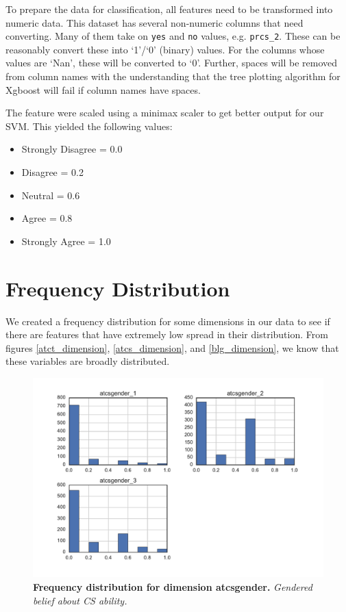 To prepare the data for classification, all features need to be transformed into numeric data. This dataset has several non-numeric columns that need converting. Many of them take on \texttt{yes} and \texttt{no} values, e.g. \texttt{prcs\_2}. These can be reasonably convert these into `1'/`0' (binary) values. For the columns whose values are `Nan', these will be converted to `0'. Further, spaces will be removed from column names with the understanding that the tree plotting algorithm for Xgboost will fail if column names have spaces. 

The feature were scaled using a minimax scaler to get better output for our SVM. This yielded the following values:
\begin {itemize}
\item Strongly Disagree = 0.0
\item Disagree = 0.2
\item Neutral = 0.6
\item Agree = 0.8
\item Strongly Agree = 1.0
\end{itemize} 



\section*{Frequency Distribution}
We created a frequency distribution for some dimensions in our data to see if there are features that have extremely low spread in their distribution. From figures \ref{atct_dimension}, \ref{atcs_dimension}, and \ref{blg_dimension}, we know that these variables are broadly distributed.

\begin{figure}[!hbtp]
\centering
    \caption{\textbf{Frequency distribution for dimension atcsgender. }\textit{Gendered belief about CS ability.}}\label{atcsgender_dimension}
    \includegraphics[width=1\textwidth]{figures/atcsgender_dimension}
\end{figure}

